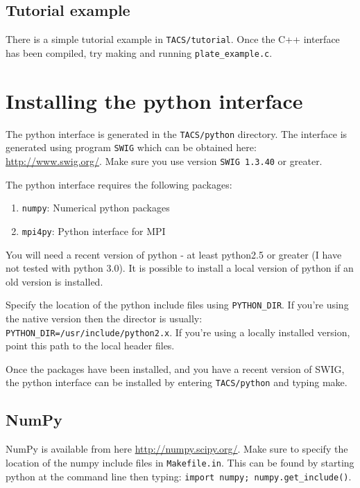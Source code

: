 \documentclass{article}
\begin{document}
\subsection{Tutorial example}

There is a simple tutorial example in \texttt{TACS/tutorial}. Once the
C++ interface has been compiled, try making and running
\texttt{plate\_example.c}.

\section{Installing the python interface}

The python interface is generated in the \texttt{TACS/python}
directory.  The interface is generated using program \texttt{SWIG}
which can be obtained here: \url{http://www.swig.org/}. Make sure you
use version \texttt{SWIG 1.3.40} or greater.

The python interface requires the following packages:
%
\begin{enumerate}
\item \texttt{numpy}: Numerical python packages
\item \texttt{mpi4py}: Python interface for MPI
\end{enumerate}

You will need a recent version of python - at least python2.5 or
greater (I have not tested with python 3.0). It is possible to install
a local version of python if an old version is installed.

Specify the location of the python include files using
\texttt{PYTHON\_DIR}.  If you're using the native version then the
director is usually: \texttt{PYTHON\_DIR=/usr/include/python2.x}. If
you're using a locally installed version, point this path to the local
header files.

Once the packages have been installed, and you have a recent version
of SWIG, the python interface can be installed by entering
\texttt{TACS/python} and typing make.

\subsection{NumPy}

NumPy is available from here \url{http://numpy.scipy.org/}. Make sure
to specify the location of the numpy include files in
\texttt{Makefile.in}. This can be found by starting python at the command line
then typing: \texttt{import numpy; numpy.get\_include()}.
\end{document}
